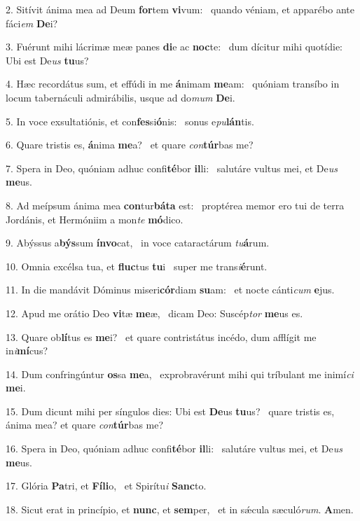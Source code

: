 2. Sitívit ánima mea ad Deum \textbf{for}tem \textbf{vi}vum: \ast\  quando véniam, et apparébo ante fáci\textit{em} \textbf{De}i?\

3. Fuérunt mihi lácrimæ meæ panes \textbf{di}e ac \textbf{noc}te: \ast\  dum dícitur mihi quotídie: Ubi est De\textit{us} \textbf{tu}us?\

4. Hæc recordátus sum, et effúdi in me \textbf{á}nimam \textbf{me}am: \ast\  quóniam transíbo in locum tabernáculi admirábilis, usque ad do\textit{mum} \textbf{De}i.\

5. In voce exsultatiónis, et con\textbf{fes}si\textbf{ó}nis: \ast\  sonus e\textit{pu}\textbf{lán}tis.\

6. Quare tristis es, \textbf{á}nima \textbf{me}a? \ast\  et quare \textit{con}\textbf{túr}bas me?\

7. Spera in Deo, quóniam adhuc confi\textbf{té}bor \textbf{il}li: \ast\  salutáre vultus mei, et De\textit{us} \textbf{me}us.\

8. Ad meípsum ánima mea \textbf{con}tur\textbf{bá}\textbf{ta} est: \ast\  proptérea memor ero tui de terra Jordánis, et Hermóniim a mon\textit{te} \textbf{mó}dico.\

9. Abýssus a\textbf{býs}sum \textbf{ín}\textbf{vo}cat, \ast\  in voce cataractárum \textit{tu}\textbf{á}rum.\

10. Omnia excélsa tua, et \textbf{fluc}tus \textbf{tu}i \ast\  super me trans\textit{i}\textbf{é}runt.\

11. In die mandávit Dóminus miseri\textbf{cór}diam \textbf{su}am: \ast\  et nocte cánti\textit{cum} \textbf{e}jus.\

12. Apud me orátio Deo \textbf{vi}tæ \textbf{me}æ, \ast\  dicam Deo: Suscép\textit{tor} \textbf{me}us es.\

13. Quare ob\textbf{lí}tus es \textbf{me}i? \ast\  et quare contristátus incédo, dum afflígit me in\textit{i}\textbf{mí}cus?\

14. Dum confringúntur \textbf{os}sa \textbf{me}a, \ast\  exprobravérunt mihi qui tríbulant me inimí\textit{ci} \textbf{me}i.\

15. Dum dicunt mihi per síngulos dies: Ubi est \textbf{De}us \textbf{tu}us? \ast\  quare tristis es, ánima mea? et quare \textit{con}\textbf{túr}bas me?\

16. Spera in Deo, quóniam adhuc confi\textbf{té}bor \textbf{il}li: \ast\  salutáre vultus mei, et De\textit{us} \textbf{me}us.\

17. Glória \textbf{Pa}tri, et \textbf{Fí}\textbf{li}o, \ast\  et Spirítu\textit{i} \textbf{Sanc}to.\

18. Sicut erat in princípio, et \textbf{nunc}, et \textbf{sem}per, \ast\  et in sǽcula sæculó\textit{rum}. \textbf{A}men.\

